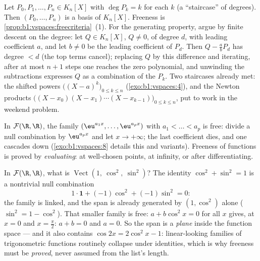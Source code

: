 \begin{example}
\label{ex:b1:vspaces:staircase}
Let $P_0, P_1, \dots, P_n \in K_n[X]$ with $\deg P_k = k$ for each
$k$ (a ``staircase'' of degrees). Then $(P_0, \dots, P_n)$ is a
basis of $K_n[X]$. Freeness is
\cref{prop:b1:vspaces:freecriteria}~(1). For the generating
property, argue by finite descent on the degree: let $Q \in
K_n[X]$, $Q \neq 0$, of degree $d$, with leading coefficient $a$,
and let $b \neq 0$ be the leading coefficient of $P_d$. Then $Q -
\frac ab P_d$ has degree $< d$ (the top terms cancel); replacing
$Q$ by this difference and iterating, after at most $n + 1$ steps
one reaches the zero polynomial, and unwinding the subtractions
expresses $Q$ as a combination of the $P_k$. Two staircases
already met: the shifted powers $\bigl((X-a)^k\bigr)_{0 \leq k
\leq n}$ (\cref{exo:b1:vspaces:4}), and the Newton products
$\bigl((X - x_0)(X - x_1)\cdots(X - x_{k-1})\bigr)_{0 \leq k \leq
n}$, put to work in the weekend problem.
\end{example}

\begin{example}\label{ex:b1:vspaces:functionfree}
In $\mathcal{F}(\R,\R)$, the family $(\eu^{a_1 x}, \dots, \eu^{a_p
x})$ with $a_1 < \dots < a_p$ is free: divide a null combination by
$\eu^{a_p x}$ and let $x \to +\infty$; the last coefficient dies,
and one cascades down (\cref{exo:b1:vspaces:8} details this and
variants). Freeness of functions is proved by \emph{evaluating}:
at well-chosen points, at infinity, or after differentiating.
\end{example}

\begin{example}
\label{ex:b1:vspaces:hiddenrelation}
In $\mathcal{F}(\R, \R)$, what is
$\operatorname{Vect}(1,\ \cos^2,\ \sin^2)$? The identity
$\cos^2 + \sin^2 = 1$ is a nontrivial null combination
\[
1\cdot\mathbf{1} + (-1)\cos^2 + (-1)\sin^2 = 0 :
\]
the family is linked, and the span is already generated by
$(1, \cos^2)$ alone ($\sin^2 = 1 - \cos^2$). That smaller family
is free: $a + b\cos^2 x = 0$ for all $x$ gives, at $x = 0$ and
$x = \frac\pi2$: $a + b = 0$ and $a = 0$. So the span is a
\emph{plane} inside the function space --- and it also contains
$\cos 2x = 2\cos^2 x - 1$: linear-looking families of
trigonometric functions routinely collapse under identities,
which is why freeness must be \emph{proved}, never assumed from
the list's length.
\end{example}

